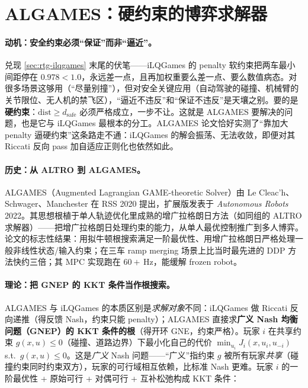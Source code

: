 \section{ALGAMES：硬约束的博弈求解器}
\label{sec:rtg-algames}

\paragraph{动机：安全约束必须“保证”而非“逼近”。}
兑现 \cref{sec:rtg-ilqgames} 末尾的伏笔——iLQGames 的 penalty 软约束把两车最小间距停在 $0.978<1.0$，永远差一点，且再加权重要么差一点、要么数值病态。对很多场景这够用（“尽量别撞”），但对安全关键应用（自动驾驶的碰撞、机械臂的关节限位、无人机的禁飞区），“逼近不违反”和“保证不违反”是天壤之别。要的是\textbf{硬约束}：$\text{dist}\ge d_{\text{safe}}$ 必须严格成立，一步不让。这就是 ALGAMES 要解决的问题，也是它与 iLQGames 最根本的分工。ALGAMES 论文恰好实测了“靠加大 penalty 逼硬约束”这条路走不通：iLQGames 的解会振荡、无法收敛，即便对其 Riccati 反向 pass 加自适应正则化也依然如此\cite{lecleach2022algames}。

\paragraph{历史：从 ALTRO 到 ALGAMES。}
ALGAMES（Augmented Lagrangian GAME-theoretic Solver）由 Le Cleac'h、Schwager、Manchester 在 RSS 2020 提出，扩展版发表于 \emph{Autonomous Robots} 2022\cite{lecleach2022algames}。其思想根植于单人轨迹优化里成熟的增广拉格朗日方法（如同组的 ALTRO 求解器）——把增广拉格朗日处理约束的能力，从单人最优控制推广到多人博弈。论文的标志性结果：用拟牛顿根搜索满足一阶最优性、用增广拉格朗日严格处理一般非线性状态/输入约束；在三车 ramp merging 场景上比当时最先进的 DDP 方法快约三倍；其 MPC 实现跑在 $60+$\,Hz，能缓解 frozen robot\cite{lecleach2022algames}。

\paragraph{理论：把 GNEP 的 KKT 条件当作根搜索。}
ALGAMES 与 iLQGames 的本质区别是\emph{求解对象}不同：iLQGames 做 Riccati 反向递推（得反馈 Nash，约束只能 penalty）；ALGAMES 直接求\textbf{广义 Nash 均衡问题（GNEP）的 KKT 条件的根}（得开环 GNE，约束严格）。玩家 $i$ 在共享约束 $g(x,u)\le0$（碰撞、道路边界）下最小化自己的代价 $\min_{u_i}J_i(x,u_i,u_{-i})$ s.t.\ $g(x,u)\le0$。这是\emph{广义} Nash 问题——“广义”指约束 $g$ 被所有玩家\emph{共享}（碰撞约束同时约束双方），玩家的可行域相互依赖，比标准 Nash 更难。玩家 $i$ 的一阶最优性 + 原始可行 + 对偶可行 + 互补松弛构成 KKT 条件：

